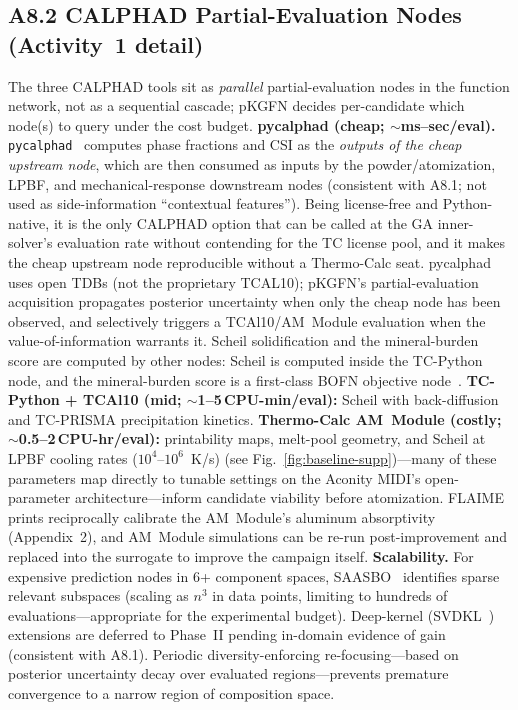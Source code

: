 \documentclass[11pt,letterpaper]{article}
\begin{document}
\subsection*{A8.2 CALPHAD Partial-Evaluation Nodes (Activity~1 detail)}
The three CALPHAD tools sit as \emph{parallel} partial-evaluation nodes
in the function network, not as a sequential cascade; pKGFN decides
per-candidate which node(s) to query under the cost budget.
\textbf{pycalphad (cheap; $\sim$ms--sec/eval).}
\texttt{pycalphad}~\cite{otis_2024_97810035} computes phase
fractions and CSI as the \emph{outputs of the cheap upstream node},
which are then consumed as inputs by the powder/atomization,
LPBF, and mechanical-response downstream nodes (consistent with
A8.1; not used as side-information ``contextual features''). Being
license-free and Python-native, it is the only CALPHAD option that
can be called at the GA inner-solver's evaluation rate without
contending for the TC license pool, and it makes the cheap upstream
node reproducible without a Thermo-Calc seat. pycalphad uses open
TDBs (not the proprietary TCAL10); pKGFN's partial-evaluation
acquisition propagates posterior uncertainty when only the cheap
node has been observed, and selectively triggers a TCAl10/AM~Module
evaluation when the value-of-information warrants it.
Scheil solidification and the mineral-burden score are computed
by other nodes: Scheil is computed inside the TC-Python node, and
the mineral-burden score is a first-class BOFN objective node~\cite{bocklund_2020_20011161}.
\textbf{TC-Python + TCAl10 (mid; $\sim$1--5\,CPU-min/eval):}
Scheil with back-diffusion and TC-PRISMA precipitation kinetics.
\textbf{Thermo-Calc AM~Module (costly; $\sim$0.5--2\,CPU-hr/eval):}
printability maps, melt-pool geometry, and Scheil at LPBF cooling rates
($10^{4}$--$10^{6}$~K/s) (see Fig.~\ref{fig:baseline-supp})---many of these parameters map directly to
tunable settings on the Aconity MIDI's open-parameter
architecture---inform candidate viability before atomization.  FLAIME
prints reciprocally calibrate the AM~Module's aluminum absorptivity
(Appendix~2), and AM~Module simulations can be re-run post-improvement
and replaced into the surrogate to improve the campaign itself.
\textbf{Scalability.} For expensive prediction nodes in 6+ component
spaces, SAASBO~\cite{eriksson_2021_21030034} identifies sparse relevant
subspaces (scaling as $n^{3}$ in data points, limiting to hundreds of
evaluations---appropriate for the experimental budget). Deep-kernel
(SVDKL~\cite{sabanzagil_2025_s4358802}) extensions are deferred to
Phase~II pending in-domain evidence of gain (consistent with A8.1).
Periodic diversity-enforcing re-focusing---based on
posterior uncertainty decay over evaluated regions---prevents premature
convergence to a narrow region of composition space.
\end{document}

